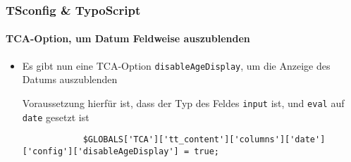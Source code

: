 \begin{frame}[fragile]
	\frametitle{TSconfig \& TypoScript}
	\framesubtitle{TCA-Option, um Datum Feldweise auszublenden}

	\lstset{basicstyle=\tiny\ttfamily}

	\begin{itemize}

		\item Es gibt nun eine TCA-Option \texttt{disableAgeDisplay}, um die Anzeige des Datums auszublenden

			Voraussetzung hierfür ist, dass der Typ des Feldes \texttt{input} ist, und \texttt{eval} auf
			\texttt{date} gesetzt ist

		\begin{lstlisting}
			$GLOBALS['TCA']['tt_content']['columns']['date']['config']['disableAgeDisplay'] = true;
		\end{lstlisting}

	\end{itemize}

\end{frame}

